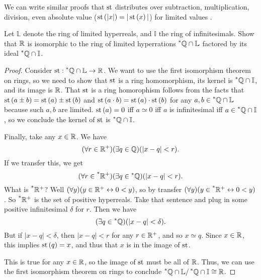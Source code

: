 We can write similar proofs that $\operatorname{st}$ distributes over subtraction, multiplication, division, even absolute value ($\operatorname{st}\left(|x|\right) = |\operatorname{st}\left(x\right)|$) for limited values \cite[Theorem~5.6.2]{goldblatt1998}.

\begin{thm}
    Let $\mathbb{L}$ denote the ring of limited hyperreals, and $\mathbb{I}$ the ring of infinitesimals. Show that $\mathbb{R}$ is isomorphic to the ring of limited hyperrations $\prescript{*}{}{\mathbb{Q}} \cap \mathbb{L}$ factored by its ideal $\prescript{*}{}{\mathbb{Q}} \cap \mathbb{I}$.
\end{thm}

\begin{proof}
    Consider $\operatorname{st}: \prescript{*}{}{\mathbb{Q}} \cap \mathbb{L} \to \mathbb{R}$. We want to use the first isomorphism theorem on rings, so we need to show that $\operatorname{st}$ is a ring homomorphism, its kernel is $\prescript{*}{}{\mathbb{Q}} \cap \mathbb{I}$, and its image is $\mathbb{R}$. That $\operatorname{st}$ is a ring homorophism follows from the facts that $\operatorname{st}\left(a \pm b\right) = \operatorname{st}\left(a\right) \pm \operatorname{st}\left(b\right)$ and $\operatorname{st}\left(a \cdot b\right) = \operatorname{st}\left(a\right) \cdot \operatorname{st}\left(b\right)$ for any $a, b \in \prescript{*}{}{\mathbb{Q}} \cap \mathbb{L}$ because such $a, b$ are limited. $\operatorname{st}\left(a\right) = 0$ iff $a \simeq 0$ iff $a$ is infinitesimal iff $a \in \prescript{*}{}{\mathbb{Q}} \cap \mathbb{I}$, so we conclude the kernel of $\operatorname{st}$ is $\prescript{*}{}{\mathbb{Q}} \cap \mathbb{I}$. 

    Finally, take any $x \in \mathbb{R}$. We have
    \[ (\forall r \in \mathbb{R}^+)(\exists q \in \mathbb{Q})(|x - q| < r). \]
    If we transfer this, we get
    \[ (\forall r \in \prescript{*}{}{\mathbb{R}^+})(\exists q \in \prescript{*}{}{\mathbb{Q}})(|x - q| < r). \] 
    What is $\prescript{*}{}{\mathbb{R}^+}$? Well $(\forall y)(y \in \mathbb{R}^+ \leftrightarrow 0 < y)$, so by transfer $(\forall y)(y \in \prescript{*}{}{\mathbb{R}^+} \leftrightarrow 0 < y)$. So $\prescript{*}{}{\mathbb{R}^+}$ is the set of positive hyperreals. Take that sentence and plug in some positive infinitesimal $\delta$ for $r$. Then we have
    \[ (\exists q \in \prescript{*}{}{\mathbb{Q}})(|x - q| < \delta). \]
    But if $|x - q| < \delta$, then $|x - q| < r$ for any $r \in \mathbb{R}^+$, and so $x \simeq q$. Since $x \in \mathbb{R}$, this implies $\operatorname{st}\left(q\right) = x$, and thus that $x$ is in the image of $\operatorname{st}$. 
    
    This is true for any $x \in \mathbb{R}$, so the image of $\operatorname{st}$ must be all of $\mathbb{R}$. Thus, we can use the first isomorphism theorem on rings to conclude $\prescript{*}{}{\mathbb{Q}} \cap \mathbb{L} / \prescript{*}{}{\mathbb{Q}} \cap \mathbb{I} \cong \mathbb{R}$.
\end{proof}